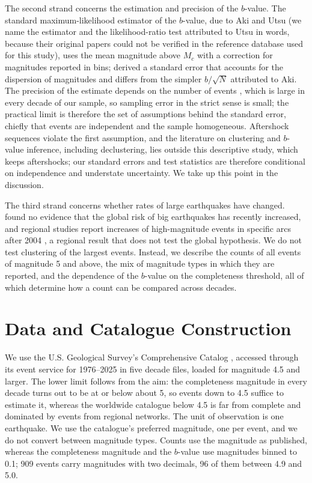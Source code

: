 \documentclass[11pt]{article}
\begin{document}
The second strand concerns the estimation and precision of the $b$-value. The standard maximum-likelihood estimator of the $b$-value, due to Aki and Utsu (we name the estimator and the likelihood-ratio test attributed to Utsu in words, because their original papers could not be verified in the reference database used for this study), uses the mean magnitude above $M_c$ with a correction for magnitudes reported in bins; \citet{shi1982the} derived a standard error that accounts for the dispersion of magnitudes and differs from the simpler $b/\sqrt{N}$ attributed to Aki. The precision of the estimate depends on the number of events \citep{kamer2014minimum}, which is large in every decade of our sample, so sampling error in the strict sense is small; the practical limit is therefore the set of assumptions behind the standard error, chiefly that events are independent and the sample homogeneous. Aftershock sequences violate the first assumption, and the literature on clustering and $b$-value inference, including declustering, lies outside this descriptive study, which keeps aftershocks; our standard errors and test statistics are therefore conditional on independence and understate uncertainty. We take up this point in the discussion.

The third strand concerns whether rates of large earthquakes have changed. \citet{shearer2011global} found no evidence that the global risk of big earthquakes has recently increased, and regional studies report increases of high-magnitude events in specific arcs after 2004 \citep{srivastava2021sundaarc}, a regional result that does not test the global hypothesis. We do not test clustering of the largest events. Instead, we describe the counts of all events of magnitude 5 and above, the mix of magnitude types in which they are reported, and the dependence of the $b$-value on the completeness threshold, all of which determine how a count can be compared across decades.

\section{Data and Catalogue Construction}

We use the U.S. Geological Survey's Comprehensive Catalog \citep{USGS_ComCat}, accessed through its event service for 1976--2025 in five decade files, loaded for magnitude 4.5 and larger. The lower limit follows from the aim: the completeness magnitude in every decade turns out to be at or below about 5, so events down to 4.5 suffice to estimate it, whereas the worldwide catalogue below 4.5 is far from complete and dominated by events from regional networks. The unit of observation is one earthquake. We use the catalogue's preferred magnitude, one per event, and we do not convert between magnitude types. Counts use the magnitude as published, whereas the completeness magnitude and the $b$-value use magnitudes binned to 0.1; 909 events carry magnitudes with two decimals, 96 of them between 4.9 and 5.0.
\end{document}
